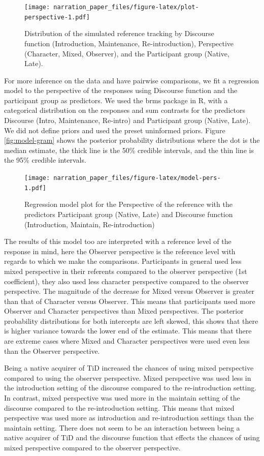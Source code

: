 \documentclass[
  english,
  doc,mask]{apa6}
\begin{document}
\begin{figure}
\centering
\texttt{[image: narration\_paper\_files/figure-latex/plot-perspective-1.pdf]}
\caption{\label{fig:plot-perspective}Distribution of the simulated reference tracking by Discourse function (Introduction, Maintenance, Re-introduction), Perspective (Character, Mixed, Observer), and the Participant group (Native, Late).}
\end{figure}

For more inference on the data and have pairwise comparisons, we fit a regression model to the perspective of the responses using Discourse function and the participant group as predictors. We used the brms package in R, with a categorical distribution on the responses and sum contrasts for the predictors Discourse (Intro, Maintenance, Re-intro) and Participant group (Native, Late). We did not define priors and used the preset uninformed priors. Figure \ref{fig:model-gram} shows the posterior probability distributions where the dot is the median estimate, the thick line is the 50\% credible intervals, and the thin line is the 95\% credible intervals.

\begin{figure}
\centering
\texttt{[image: narration\_paper\_files/figure-latex/model-pers-1.pdf]}
\caption{\label{fig:model-pers}Regression model plot for the Perspective of the reference with the predictors Participant group (Native, Late) and Discourse function (Introduction, Maintain, Re-introduction)}
\end{figure}

The results of this model too are interpreted with a reference level of the response in mind, here the Observer perspective is the reference level with regards to which we make the comparisons. Participants in general used less mixed perspective in their referents compared to the observer perspective (1st coefficient), they also used less character perspective compared to the observer perspective. The magnitude of the decrease for Mixed versus Observer is greater than that of Character versus Observer. This means that participants used more Observer and Character perspectives than Mixed perspectives. The posterior probability distributions for both intercepts are left skewed, this shows that there is higher variance towards the lower end of the estimate. This means that there are extreme cases where Mixed and Character perspectives were used even less than the Observer perspective.

Being a native acquirer of TiD increased the chances of using mixed perspective compared to using the observer perspective. Mixed perspective was used less in the introduction setting of the discourse compared to the re-introduction setting. In contrast, mixed perspective was used more in the maintain setting of the discourse compared to the re-introduction setting. This means that mixed perspective was used more as introduction and re-introduction settings than the maintain setting. There does not seem to be an interaction between being a native acquirer of TiD and the discourse function that effects the chances of using mixed perspective compared to the observer perspective.
\end{document}
